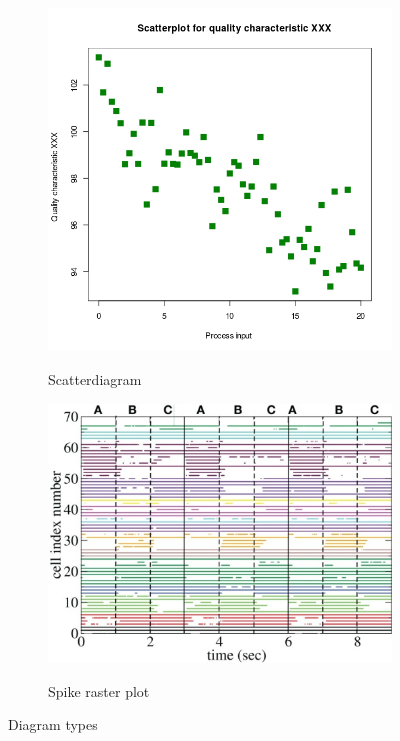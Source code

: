 \documentclass[twoside, english, final]{Pflichtenheft}
\begin{document}
\begin{figure}[!h]
\begin{subfigure}[h]{0.475\textwidth}
		\includegraphics[width=\textwidth]{Images/Scatter_diagram.png}
		\caption[]%
		{{\small Scatterdiagram}} \cite{Thirdarticle}
		\label{fig:Diagram types}
	\end{subfigure}
	\quad
	\begin{subfigure}[h]{0.475\textwidth}
		\centering
		\includegraphics[width=\textwidth]{Images/spike_raster_plot.png}
		\caption[]%
		{{\small Spike raster plot}} \cite{Fourtharticle}
		\label{fig:mean and std of net44}
	\end{subfigure}
	\caption[ Diagram types ]
	{\small Diagram types}
	\label{fig:Diagram types}
\end{figure}
\vfill
\clearpage
\end{document}
